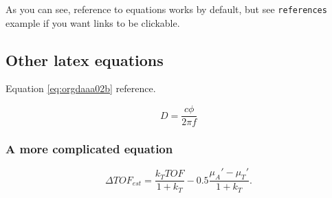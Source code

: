 As you can see, reference to equations works by default, but see \texttt{references}
example if you want links to be clickable.

\subsection{Other latex equations}
\label{sec:orgf100c0b}
Equation \ref{eq:orgdaaa02b} reference.

\begin{equation}
\label{eq:orgdaaa02b}
D = \frac{c\phi}{2\pi f}
\end{equation}

\subsubsection{A more complicated equation}
\label{sec:orgfdb3c1c}

\begin{equation}
\Delta TOF_{est} = \frac{k_T TOF}{1+k_T } - 0.5 \frac{\mu_A' - \mu_T'}{1+k_T}.
\end{equation}



